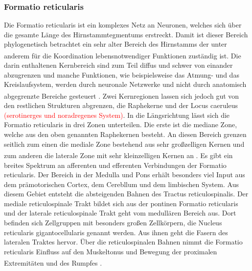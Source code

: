 \documentclass[12pt,a4paper,pdftex]{article}
\begin{document}
\subsubsection*{Formatio reticularis} 
Die Formatio reticularis ist ein komplexes Netz an Neuronen, welches sich über die gesamte Länge des Hirnstammtegmentums erstreckt. Damit ist dieser Bereich phylogenetisch betrachtet ein sehr alter Bereich des Hirnstamms der unter anderem für die Koordination lebensnotwendiger Funktionen zuständig ist\textsuperscript{\cite[6]{trepel2011neuroanatomie}}. Die darin enthaltenen Kernbereich sind zum Teil diffus und schwer von einander abzugrenzen und manche Funktionen, wie beispielsweise das Atmung- und das Kreislaufsystem, werden durch neuronale Netzwerke und nicht durch anatomisch abgegrenzte Bereiche gesteuert \textsuperscript{\cite[9]{crossman2014neuroanatomy}}. Zwei Kernregionen lassen sich jedoch gut von den restlichen Strukturen abgrenzen, die Raphekerne und der Locus caeruleus \textcolor{red}{(serotinerges und noradregenes System)}. In die Längsrichtung lässt sich die Formatio reticularis in drei Zonen unterteilen. Die erste ist die mediane Zone, welche aus den oben genannten Raphekernen besteht. An diesen Bereich grenzen seitlich zum einen die mediale Zone bestehend aus sehr großzelligen Kernen und zum anderen die laterale Zone mit sehr kleinzelligen Kernen an \textsuperscript{\cite[6]{trepel2011neuroanatomie}}. Es gibt ein breites Spektrum an afferenten und efferenten Verbindungen der Formatio reticularis. Der Bereich in der Medulla und Pons erhält besonders viel Input aus dem prämotorischen Cortex, dem Cerebllum und dem limbischen System. Aus diesem Gebiet entsteht die absteigenden Bahnen des Tractus reticulospinalis. Der mediale reticulospinale Trakt bildet sich aus der pontinen Formatio reticularis und der laterale reticulospinale Trakt geht vom medullären Bereich aus. Dort befinden sich Zellgruppen mit besonders großen Zellkörpern, die Nucleus reticularis gigantocellularis genannt werden. Aus ihnen geht die Fasern des lateralen Traktes hervor. Über die reticulospinalen Bahnen nimmt die Formatio reticularis Einfluss auf den Muskeltonus und Bewegung der proximalen Extremitäten und des Rumpfes \textsuperscript{\cite[9]{crossman2014neuroanatomy}}.
\end{document}
